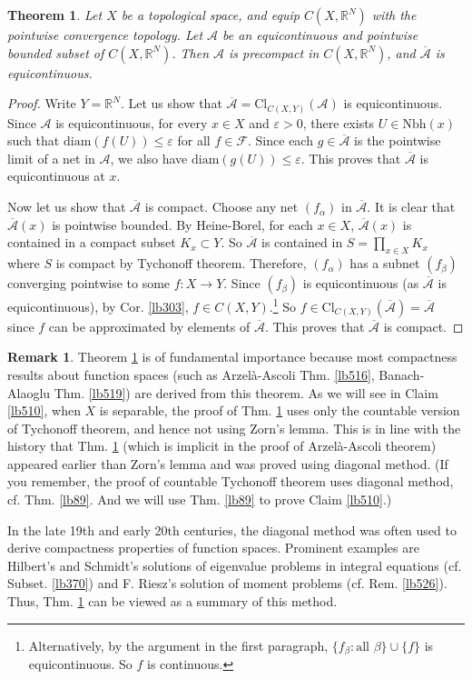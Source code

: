 \documentclass[12pt,b5paper,notitlepage]{article}
\theoremstyle{definition}
\newtheorem{rem}[df]{Remark}
\theoremstyle{plain}
\newtheorem{thm}[df]{Theorem}
\newcommand{\ovl}{\overline}
\newcommand{\scr}{\mathscr}
\newcommand{\Rbb}{\mathbb R}
\newcommand{\Nbh}{\mathrm{Nbh}}
\newcommand{\Cl}{\mathrm{Cl}}
\newcommand{\diam}{\mathrm{diam}}
\newcommand{\eps}{\varepsilon}
\numberwithin{equation}{section}
\begin{document}
\begin{thm}\label{lb509}
Let $X$ be a topological space, and equip $C(X,\Rbb^N)$ with the pointwise convergence topology. Let $\scr A$ be an equicontinuous and pointwise bounded subset of $C(X,\Rbb^N)$. Then $\scr A$ is precompact in $C(X,\Rbb^N)$, and $\ovl{\scr A}$ is equicontinuous. 
\end{thm}




\begin{proof}
Write $Y=\Rbb^N$. Let us show that $\ovl{\scr A}=\Cl_{C(X,Y)}(\scr A)$ is equicontinuous. Since $\scr A$ is equicontinuous, for every $x\in X$ and $\eps>0$, there exists $U\in\Nbh(x)$ such that $\diam(f(U))\leq\eps$ for all $f\in\scr F$. Since each $g\in\ovl{\scr A}$ is the pointwise limit of a net in $\scr A$, we also have $\diam(g(U))\leq\eps$. This proves that $\ovl{\scr A}$ is equicontinuous at $x$.


Now let us show that $\ovl{\scr A}$ is compact. Choose any net $(f_\alpha)$ in $\ovl{\scr A}$. It is clear that $\ovl{\scr A}(x)$ is pointwise bounded. By Heine-Borel, for each $x\in X$, $\ovl{\scr A}(x)$ is contained in a compact subset $K_x\subset Y$. So $\ovl{\scr A}$ is contained in $S=\prod_{x\in X}K_x$ where $S$ is compact by Tychonoff theorem. Therefore, $(f_\alpha)$ has a subnet $(f_\beta)$ converging pointwise to some $f:X\rightarrow Y$. Since $(f_\beta)$ is equicontinuous (as $\ovl{\scr A}$ is equicontinuous), by Cor. \ref{lb303}, $f\in C(X,Y)$.\footnote{Alternatively, by the argument in the first paragraph, $\{f_\beta:\text{all }\beta\}\cup\{f\}$ is equicontinuous. So $f$ is continuous.}  So $f\in\Cl_{C(X,Y)}(\ovl{\scr A})=\ovl{\scr A}$ since $f$ can be approximated by elements of $\ovl{\scr A}$. This proves that $\ovl{\scr A}$ is compact.
\end{proof}

\begin{rem}\label{lb524}
Theorem \ref{lb509} is of fundamental importance because most compactness results about function spaces (such as Arzel\`a-Ascoli Thm. \ref{lb516}, Banach-Alaoglu Thm. \ref{lb519}) are derived from this theorem. As we will see in Claim \ref{lb510}, when $X$ is separable, the proof of Thm. \ref{lb509} uses only the countable version of Tychonoff theorem, and hence not using Zorn's lemma. This is in line with the history that Thm. \ref{lb509} (which is implicit in the proof of Arzel\`a-Ascoli theorem) appeared earlier than Zorn's lemma and was proved using diagonal method. (If you remember, the proof of countable Tychonoff theorem uses diagonal method, cf. Thm. \ref{lb89}. And we will use Thm. \ref{lb89} to prove Claim \ref{lb510}.) 

In the late 19th and early 20th centuries, the diagonal method was often used to derive compactness properties of function spaces. Prominent examples are Hilbert's and Schmidt's solutions of eigenvalue problems in integral equations (cf. Subset. \ref{lb370}) and F. Riesz's solution of moment problems (cf. Rem. \ref{lb526}). Thus, Thm. \ref{lb509} can be viewed as a summary of this method.  \hfill\qedsymbol
\end{rem}
\end{document}
